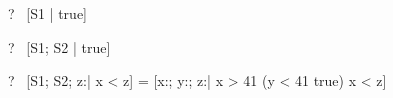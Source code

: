 \begin{zed}
  \vdash?~ [S1 | true] 
\end{zed}

\begin{zed}
  \vdash?~ [S1; S2 | true] 
\end{zed}

\begin{zed}
  \vdash?~ [S1; S2; z:\nat | x < z] =
           [x:\nat; y:\nat; z:\nat | x > 41 \land (y < 41 \land true)
                                     \land x < z]
\end{zed}

